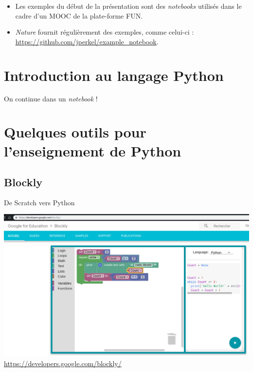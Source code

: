 \documentclass[10pt,aspectratio=169]{beamer}
\begin{document}
\begin{frame}
  \begin{itemize}
  \item Les exemples du début de la présentation sont des \emph{notebooks} utilisés dans le cadre d'un MOOC de la plate-forme FUN.
  \item \emph{Nature} fournit régulièrement des exemples, comme celui-ci : \url{https://github.com/jperkel/example_notebook}.
  \end{itemize}
\end{frame}

\section{Introduction au langage Python}

\begin{frame}
  On continue dans un \emph{notebook} !
\end{frame}

\section{Quelques outils pour l'enseignement de Python}

\subsection{Blockly}

\begin{frame}{De Scratch vers Python}
  \begin{center}
    \includegraphics[height = .6\textheight]{blockly}
    \url{https://developers.google.com/blockly/}
  \end{center}
\end{frame}
\end{document}
